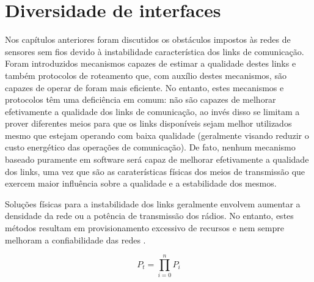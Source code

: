 \documentclass[
	12pt,				%
	openright,			%
	oneside,
	a4paper,			%
	english,			%
	french,				%
	spanish,			%
	brazil				%
	]{abntex2}
\begin{document}
\chapter{Diversidade de interfaces} \label{chap_div_int}

Nos capítulos anteriores foram discutidos os obstáculos impostos às redes de sensores sem fios devido à instabilidade característica dos links de comunicação. Foram introduzidos mecanismos capazes de estimar a qualidade destes links e também protocolos de roteamento que, com auxílio destes mecanismos, são capazes de operar de foram mais eficiente. No entanto, estes mecanismos e protocolos têm uma deficiência em comum: não são capazes de melhorar efetivamente a qualidade dos links de comunicação, ao invés disso se limitam a prover diferentes meios para que os links disponíveis sejam melhor utilizados mesmo que estejam operando com baixa qualidade (geralmente visando reduzir o custo energético das operações de comunicação). De fato, nenhum mecanismo baseado puramente em software será capaz de melhorar efetivamente a qualidade dos links, uma vez que são as caraterísticas físicas dos meios de transmissão que exercem maior influência sobre a qualidade e a estabilidade dos mesmos.

Soluções físicas para a instabilidade dos links geralmente envolvem aumentar a densidade da rede ou a potência de transmissão dos rádios. No entanto, estes métodos resultam em provisionamento excessivo de recursos e nem sempre melhoram a confiabilidade das redes \cite{Kusy2011}.

\begin{equation}
	P_{t} = \prod_{i = 0}^{n}P_{i}
	\label{eq_indep_fail_prob}
\end{equation}
\end{document}
